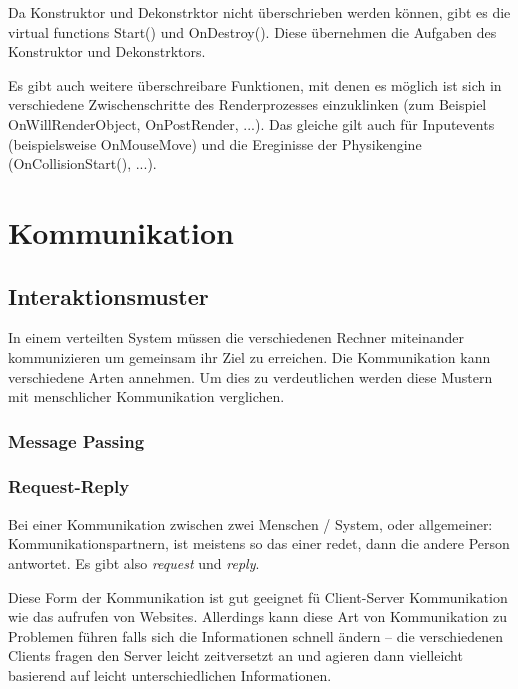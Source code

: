 Da Konstruktor und Dekonstrktor nicht {\"{u}}berschrieben werden k{\"{o}}nnen, gibt es die virtual functions Start() und OnDestroy(). Diese
{\"{u}}bernehmen die Aufgaben des Konstruktor und Dekonstrktors.

Es gibt auch weitere {\"{u}}berschreibare Funktionen, mit denen es m{\"{o}}glich ist sich in verschiedene Zwischenschritte des Renderprozesses
einzuklinken (zum Beispiel OnWillRenderObject, OnPostRender, ...). Das gleiche gilt auch f{\"{u}}r Inputevents (beispielsweise OnMouseMove) und
die Ereginisse der Physikengine (OnCollisionStart(), ...).

\clearpage
\section{Kommunikation}

\subsection{Interaktionsmuster}
In einem verteilten System m{\"{u}}ssen die verschiedenen Rechner miteinander kommunizieren um
gemeinsam ihr Ziel zu erreichen. Die Kommunikation kann verschiedene Arten annehmen. Um dies zu verdeutlichen
werden diese Mustern mit menschlicher Kommunikation verglichen.

\subsubsection{Message Passing}
\todo{}

\subsubsection{Request-Reply}
Bei einer Kommunikation zwischen zwei Menschen / System, oder allgemeiner: Kommunikationspartnern,
ist meistens so das einer redet, dann die andere Person antwortet. Es gibt also \textit{request}
und \textit{reply}.

Diese Form der Kommunikation ist gut geeignet f{\"{u}} Client-Server Kommunikation wie das
aufrufen von Websites. Allerdings kann diese Art von Kommunikation zu Problemen f{\"{u}}hren falls sich die
Informationen schnell {\"{a}}ndern -- die verschiedenen Clients fragen den Server leicht zeitversetzt an und
agieren dann vielleicht basierend auf leicht unterschiedlichen Informationen.

